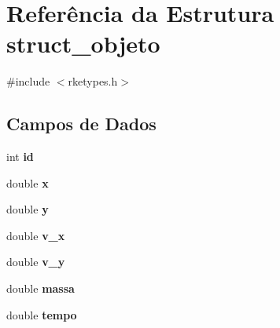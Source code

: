 \hypertarget{structstruct__objeto}{\section{Referência da Estrutura struct\-\_\-objeto}
\label{structstruct__objeto}
}


{\ttfamily \#include $<$rketypes.\-h$>$}

\subsection*{Campos de Dados}
\begin{DoxyCompactItemize}
\item 
\hypertarget{structstruct__objeto_a7441ef0865bcb3db9b8064dd7375c1ea}{int {\bfseries id}}\label{structstruct__objeto_a7441ef0865bcb3db9b8064dd7375c1ea}

\item 
\hypertarget{structstruct__objeto_af88b946fb90d5f08b5fb740c70e98c10}{double {\bfseries x}}\label{structstruct__objeto_af88b946fb90d5f08b5fb740c70e98c10}

\item 
\hypertarget{structstruct__objeto_ab927965981178aa1fba979a37168db2a}{double {\bfseries y}}\label{structstruct__objeto_ab927965981178aa1fba979a37168db2a}

\item 
\hypertarget{structstruct__objeto_af8ea4d2851d2d656fd42be239e36ce6e}{double {\bfseries v\-\_\-x}}\label{structstruct__objeto_af8ea4d2851d2d656fd42be239e36ce6e}

\item 
\hypertarget{structstruct__objeto_a2161079bbf87834cfdf4d3548a53eb3b}{double {\bfseries v\-\_\-y}}\label{structstruct__objeto_a2161079bbf87834cfdf4d3548a53eb3b}

\item 
\hypertarget{structstruct__objeto_a3cb08d781a7ecc13047f1631906f7df5}{double {\bfseries massa}}\label{structstruct__objeto_a3cb08d781a7ecc13047f1631906f7df5}

\item 
\hypertarget{structstruct__objeto_aff2f6d52166217d13f9b2072c9e67c13}{double {\bfseries tempo}}\label{structstruct__objeto_aff2f6d52166217d13f9b2072c9e67c13}

\end{DoxyCompactItemize}


